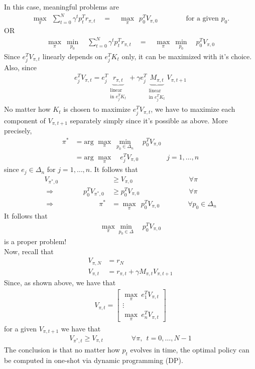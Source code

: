\documentclass[]{article}
\begin{document}
In this case, meaningful problems are
\begin{align}
\max_{\pi} \ \ \sum_{t=0}^N \gamma^t p_t^T r_{\pi,t} \quad = \quad \max_\pi \  \  p_0^T V_{\pi,0}  \qquad \qquad \text{for a given $p_0$.}
\end{align}
OR
\begin{align}
\max_\pi \ \min_{p_0} \quad \sum_{t=0}^N \gamma^t p_t^T r_{\pi,t} \quad = \quad \max_\pi \ \min_{p_0} \quad p_0^T V_{\pi,0}
\end{align}
Since $e_j^T V_{\pi,t}$ linearly depends on $e_j^T K_t$ only, it can be maximized with it's choice.  Also, since
\begin{align}
e_j^T V_{\pi,t} = e_j^T \underbrace{r_{\pi,t}}_
{\substack{\text{linear} \\ \text{in $e_j^TK_t$}}}
+ \gamma e_j^T \underbrace{M_{\pi,t}}_
{\substack{\text{linear} \\ \text{in $e_j^TK_t$}}}
V_{\pi,t+1}
\end{align}
No matter how $K_t$ is chosen to maximize $e_j^T V_{\pi,t}$, we have to maximize each component of $V_{\pi,t+1}$ separately simply since it's possible as above. More precisely,
\begin{align}
\pi^* & = \text{arg } \max_\pi \ \min_{p_0 \in \Delta_n} \quad p_0^T V_{\pi,0} \\ 
& = \text{arg } \max_\pi \quad e_j^T V_{\pi,0} \qquad \qquad j=1,\dots,n
\end{align}
since $e_j \in \Delta_n$ for $j=1,\dots,n$.  It follows that
\begin{align}
V_{\pi^*,0} & \geq V_{\pi,0}  \qquad \qquad \qquad \qquad \forall \pi \\
\Rightarrow  \qquad \qquad  p_0^T V_{\pi^*,0} & \geq p_0^T V_{\pi,0} \qquad \qquad \qquad \quad \forall \pi \\
\Rightarrow \ \qquad \qquad \qquad  \pi^* & = \max_\pi \ \ p_0^T V_{\pi,0} \qquad \qquad \forall p_0 \in \Delta_n
\end{align}
It follows that
\begin{align}
\max_\pi \min_{p_0 \in \Delta} \quad p_0^T V_{\pi,0}
\end{align}
is a proper problem! \\
Now, recall that
\begin{align}
V_{\pi,N} & = r_N \\
V_{\pi,t} & = r_{\pi,t} + \gamma M_{\pi,t} V_{\pi,t+1}
\end{align}
Since, as shown above, we have that
\begin{align}
V_{\pi,t} = \begin{bmatrix} \max_\pi \ e_1^T V_{\pi,t} \\ \vdots \\ \max_\pi \ e_n^T V_{\pi,t} \end{bmatrix}
\end{align}
for a given $V_{\pi,t+1}$ we have that
\begin{align}
V_{\pi^*,t} \geq V_{\pi,t} \qquad \qquad \forall \pi, \ \ t=0,\dots,N-1
\end{align}
The conclusion is that no matter how $p_t$ evolves in time, the optimal policy can be computed in one-shot via dynamic programming (DP).
\end{document}
